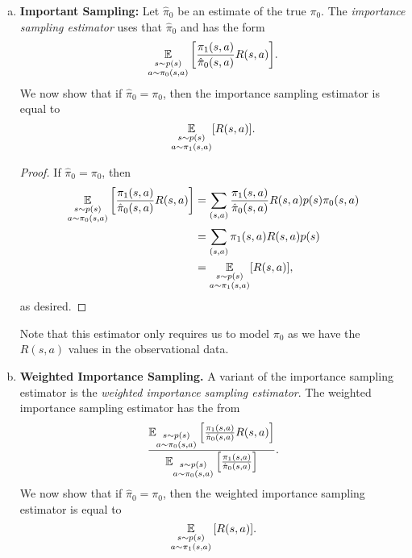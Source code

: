 \documentclass[12pt,letterpaper,boxed]{hmcpset}
\begin{document}
\begin{solution}
  \begin{enumerate}[(a)]
    \item \textbf{Important Sampling:} Let $\hat \pi_0$ be an estimate of the true $\pi_0$. The \emph{importance sampling estimator} uses that $\hat \pi_0$ and has the form 
    \[
    \operatorname*{\mathbb{E}}_{\substack{s \sim p(s) \\ a \sim \pi_0 (s,a)}} \qty[\frac{\pi_1(s,a)}{\hat \pi_0 (s,a)} R(s,a)].
    \]
    We now show that if $\hat \pi_0 = \pi_0$, then the importance sampling estimator is equal to 
    \[
    \operatorname*{\mathbb{E}}_{\substack{s \sim p(s) \\ a \sim \pi_1(s,a)}} [R(s,a)].
    \]
    
    \begin{proof}
      If $\hat \pi_0 = \pi_0$, then
      \[
      \begin{aligned}
        \operatorname*{\mathbb{E}}_{\substack{s \sim p(s) \\ a \sim \pi_0 (s,a)}} \qty[\frac{\pi_1(s,a)}{\hat \pi_0 (s,a)} R(s,a)] &= 
        \sum_{(s,a)} \frac{\pi_1(s,a)}{\hat \pi_0 (s,a)} R(s,a) p(s) \pi_0 (s,a) \\
        &= \sum_{(s,a)} \pi_1(s,a) R(s,a) p(s) \\
        &= \operatorname*{\mathbb{E}}_{\substack{s \sim p(s) \\ a \sim \pi_1(s,a)}} [R(s,a)],
      \end{aligned}
      \]
      as desired.
    \end{proof}
    Note that this estimator only requires us to model $\pi_0$ as we have the $R(s,a)$ values in the observational data.

    \item \textbf{Weighted Importance Sampling.} A variant of the importance sampling estimator is the \emph{weighted importance sampling estimator}. The weighted importance sampling estimator has the from
    \[
    \frac{\operatorname*{\mathbb{E}}_{\substack{s \sim p(s) \\ a \sim \pi_0 (s,a)}}\qty[\frac{\pi_1(s,a)}{\hat \pi_0 (s,a)} R(s,a)] }{ \operatorname*{\mathbb{E}}_{\substack{s \sim p(s) \\ a \sim \pi_0 (s,a)}}\qty[\frac{\pi_1(s,a)}{\hat \pi_0 (s,a)}] }.
    \]
    We now show that if $\hat \pi_0 = \pi_0$, then the weighted importance sampling estimator is equal to 
    \[
    \operatorname*{\mathbb{E}}_{\substack{s \sim p(s) \\ a \sim \pi_1(s,a)}} \qty[R(s,a)].
    \]


\end{enumerate}
\end{solution}
\end{document}
